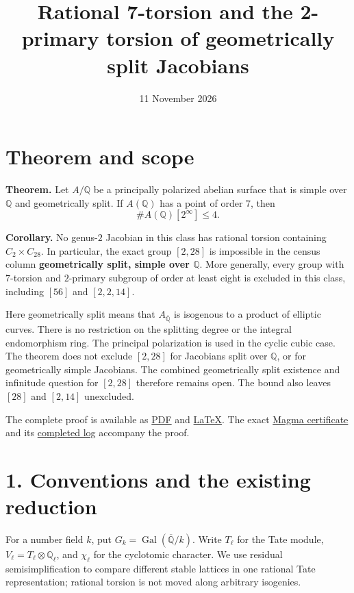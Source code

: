 \documentclass[
  11pt,
]{article}
\title{Rational 7-torsion and the 2-primary torsion of geometrically
split Jacobians}
\author{}
\date{11 November 2026}
\begin{document}
\maketitle

\section{Theorem and scope}\label{theorem-and-scope}

\textbf{Theorem.} Let \(A/\mathbb Q\) be a principally polarized abelian
surface that is simple over \(\mathbb Q\) and geometrically split. If
\(A(\mathbb Q)\) has a point of order \(7\), then \[
\#A(\mathbb Q)[2^\infty]\leq 4.
\]

\textbf{Corollary.} No genus-\(2\) Jacobian in this class has rational
torsion containing \(C_2\times C_{28}\). In particular, the exact group
\([2,28]\) is impossible in the census column \textbf{geometrically
split, simple over \(\mathbb Q\)}. More generally, every group with
\(7\)-torsion and \(2\)-primary subgroup of order at least eight is
excluded in this class, including \([56]\) and \([2,2,14]\).

Here geometrically split means that \(A_{\overline{\mathbb Q}}\) is
isogenous to a product of elliptic curves. There is no restriction on
the splitting degree or the integral endomorphism ring. The principal
polarization is used in the cyclic cubic case. The theorem does not
exclude \([2,28]\) for Jacobians split over \(\mathbb Q\), or for
geometrically simple Jacobians. The combined geometrically split
existence and infinitude question for \([2,28]\) therefore remains open.
The bound also leaves \([28]\) and \([2,14]\) unexcluded.

The complete proof is available as
\href{https://genus-2-torsion.github.io/data/knowledge/sources/qsimple_228_obstruction.pdf}{PDF}
and
\href{https://genus-2-torsion.github.io/data/knowledge/sources/qsimple_228_obstruction.tex}{LaTeX}.
The exact
\href{https://genus-2-torsion.github.io/data/knowledge/sources/qsimple_228_checks.m}{Magma
certificate} and its
\href{https://genus-2-torsion.github.io/data/knowledge/sources/qsimple_228_checks.log}{completed
log} accompany the proof.

\section{1. Conventions and the existing
reduction}\label{conventions-and-the-existing-reduction}

For a number field \(k\), put
\(G_k=\operatorname{Gal}(\overline{\mathbb Q}/k)\). Write \(T_\ell\) for
the Tate module, \(V_\ell=T_\ell\otimes\mathbb Q_\ell\), and
\(\chi_\ell\) for the cyclotomic character. We use residual
semisimplification to compare different stable lattices in one rational
Tate representation; rational torsion is not moved along arbitrary
isogenies.
\end{document}
